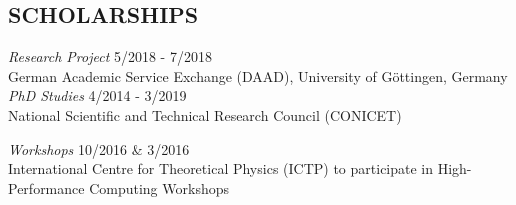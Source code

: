 \documentclass[margin]{res}
\begin{document}
\begin{resume}
\section{SCHOLARSHIPS}  {\sl Research Project} 
	\hfill  5/2018 - 7/2018 \\
	German Academic Service Exchange
	(DAAD), University of G\"ottingen, Germany \\

	{\sl PhD Studies} \hfill  4/2014 - 3/2019 \\
	National Scientific and Technical Research Council (CONICET)
	
	{\sl Workshops} \hfill { 10/2016 \& 3/2016} \\
	International Centre for Theoretical Physics (ICTP) 
	to participate in High-Performance Computing Workshops



\end{resume}
\end{document}
